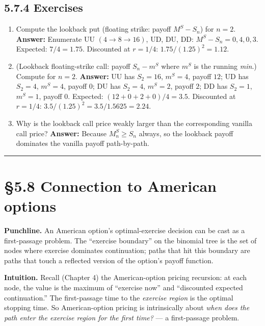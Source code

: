 \documentclass[
  10pt,
  twoside]{book}
\providecommand{\tightlist}{%
  \setlength{\itemsep}{0pt}\setlength{\parskip}{0pt}}
\begin{document}
\subsection{5.7.4 Exercises}\label{exercises-25}

\begin{enumerate}
\def\labelenumi{\arabic{enumi}.}
\tightlist
\item
  Compute the lookback put (floating strike: payoff \(M^S - S_n\)) for
  \(n = 2\). \textbf{Answer:} Enumerate UU \((4 \to 8 \to 16)\), UD, DU,
  DD: \(M^S - S_n = 0, 4, 0, 3\). Expected: \(7/4 = 1.75\). Discounted
  at \(r = 1/4\): \(1.75/(1.25)^2 = 1.12\).
\item
  (Lookback floating-strike call: payoff \(S_n - m^S\) where \(m^S\) is
  the running \emph{min}.) Compute for \(n = 2\). \textbf{Answer:} UU
  has \(S_2 = 16\), \(m^S = 4\), payoff \(12\); UD has \(S_2 = 4\),
  \(m^S = 4\), payoff \(0\); DU has \(S_2 = 4\), \(m^S = 2\), payoff
  \(2\); DD has \(S_2 = 1\), \(m^S = 1\), payoff \(0\). Expected:
  \((12 + 0 + 2 + 0)/4 = 3.5\). Discounted at \(r = 1/4\):
  \(3.5/(1.25)^2 = 3.5/1.5625 = 2.24\).
\item
  Why is the lookback call price weakly larger than the corresponding
  vanilla call price? \textbf{Answer:} Because \(M^S_n \ge S_n\) always,
  so the lookback payoff dominates the vanilla payoff path-by-path.
\end{enumerate}

\begin{center}\rule{0.5\linewidth}{0.5pt}\end{center}

\section{§5.8 Connection to American
options}\label{connection-to-american-options}

\textbf{Punchline.} An American option's optimal-exercise decision can
be cast as a first-passage problem. The ``exercise boundary'' on the
binomial tree is the set of nodes where exercise dominates continuation;
paths that hit this boundary are paths that touch a reflected version of
the option's payoff function.

\textbf{Intuition.} Recall (Chapter 4) the American-option pricing
recursion: at each node, the value is the maximum of ``exercise now''
and ``discounted expected continuation.'' The first-passage time to the
\emph{exercise region} is the optimal stopping time. So American-option
pricing is intrinsically about \emph{when does the path enter the
exercise region for the first time?} --- a first-passage problem.
\end{document}
